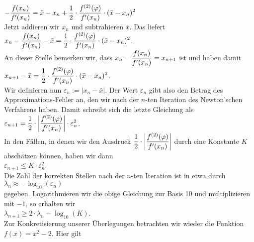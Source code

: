 \\[0.2cm]
\hspace*{1.3cm}
$\displaystyle - \frac{f(x_n)}{f'(x_n)} = 
 \bar{x} - x_n + \frac{1}{2} \cdot \frac{f^{(2)}(\varphi)}{f'(x_n)} \cdot (\bar{x} - x_n)^2$
\\[0.2cm]
Jetzt addieren wir $x_n$ und subtrahieren $\bar{x}$.  Das liefert
\\[0.2cm]
\hspace*{1.3cm}
$\displaystyle x_n - \frac{f(x_n)}{f'(x_n)} - \bar{x} = 
 \frac{1}{2} \cdot \frac{f^{(2)}(\varphi)}{f'(x_n)} \cdot (\bar{x} - x_n)^2
$.
\\[0.2cm]
An dieser Stelle bemerken wir, dass $\displaystyle x_n - \frac{f(x_n)}{f'(x_n)} = x_{n+1}$ ist und haben damit
\\[0.2cm]
\hspace*{1.3cm}
$\displaystyle x_{n+1} - \bar{x} = \frac{1}{2} \cdot \frac{f^{(2)}(\varphi)}{f'(x_n)} \cdot (\bar{x} - x_n)^2$.
\\[0.2cm]
Wir definieren nun $\varepsilon_n := |x_n - \bar{x}|$.  Der Wert $\varepsilon_n$ gibt also den
Betrag des Approximations-Fehler an, den wir nach der $n$-ten Iteration des Newton'schen Verfahrens
haben.  Damit schreibt sich die letzte Gleichung als
\\[0.2cm]
\hspace*{1.3cm}
$\displaystyle \varepsilon_{n+1} = \frac{1}{2} \cdot \left|\frac{f^{(2)}(\varphi)}{f'(x_n)}\right| \cdot \varepsilon_n^2$.
\\[0.2cm]
In den F\"allen, in denen  wir den Ausdruck 
$\displaystyle \frac{1}{2} \cdot \left|\frac{f^{(2)}(\varphi)}{f'(x_n)}\right|$ 
durch
eine Konstante $K$ absch\"atzen k\"onnen, haben wir dann
\\[0.2cm]
\hspace*{1.3cm}
$\varepsilon_{n+1} \leq  K \cdot \varepsilon_{n}^2$.
\\[0.2cm]
Die Zahl der korrekten Stellen nach der $n$-ten Iteration ist in etwa durch
\\[0.2cm]
\hspace*{1.3cm}
$\lambda_{n} \approx -\log_{10}(\varepsilon_n)$ 
\\[0.2cm]
gegeben.  Logarithmieren wir die obige Gleichung zur Basis 10 und multiplizieren mit $-1$, so erhalten wir
\\[0.2cm]
\hspace*{1.3cm}
$\lambda_{n+1} \geq 2 \cdot \lambda_n - \log_{10}(K)$.
\\[0.2cm]
Zur Konkretisierung unserer \"Uberlegungen betrachten wir wieder die Funktion $f(x) = x^2 -2$.  Hier gilt
\\[0.2cm]
